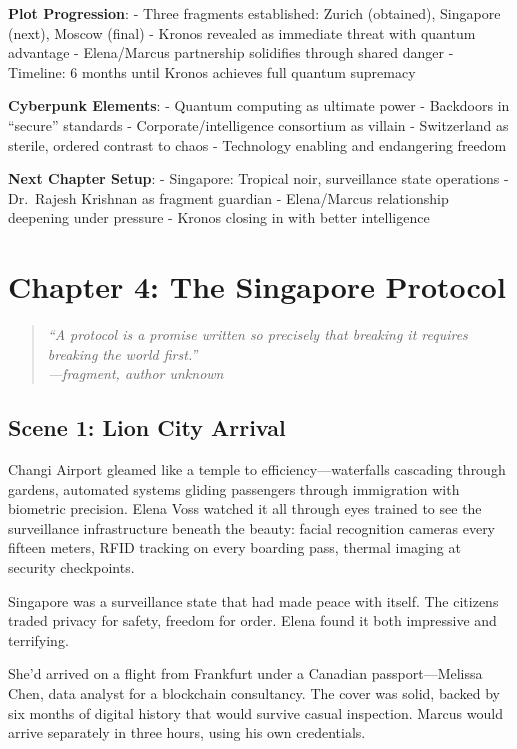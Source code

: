\documentclass[12pt,letterpaper]{book}
\begin{document}
\textbf{Plot Progression}: - Three fragments established: Zurich (obtained), Singapore (next), Moscow (final) - Kronos revealed as immediate threat with quantum advantage - Elena/Marcus partnership solidifies through shared danger - Timeline: 6 months until Kronos achieves full quantum supremacy

\textbf{Cyberpunk Elements}: - Quantum computing as ultimate power - Backdoors in ``secure'' standards - Corporate/intelligence consortium as villain - Switzerland as sterile, ordered contrast to chaos - Technology enabling and endangering freedom

\textbf{Next Chapter Setup}: - Singapore: Tropical noir, surveillance state operations - Dr.~Rajesh Krishnan as fragment guardian - Elena/Marcus relationship deepening under pressure - Kronos closing in with better intelligence


\hypertarget{chapter-4-the-singapore-protocol}{%
\section{Chapter 4: The Singapore Protocol}\label{chapter-4-the-singapore-protocol}}

\begin{quote}
\itshape ``A protocol is a promise written so precisely that breaking it requires
breaking the world first.''\\
\normalfont\hfill---fragment, author unknown
\end{quote}

\hypertarget{scene-1-lion-city-arrival}{%
\subsection{Scene 1: Lion City Arrival}\label{scene-1-lion-city-arrival}}

Changi Airport gleamed like a temple to efficiency---waterfalls cascading through gardens, automated systems gliding passengers through immigration with biometric precision. Elena Voss watched it all through eyes trained to see the surveillance infrastructure beneath the beauty: facial recognition cameras every fifteen meters, RFID tracking on every boarding pass, thermal imaging at security checkpoints.

Singapore was a surveillance state that had made peace with itself. The citizens traded privacy for safety, freedom for order. Elena found it both impressive and terrifying.

She'd arrived on a flight from Frankfurt under a Canadian passport---Melissa Chen, data analyst for a blockchain consultancy. The cover was solid, backed by six months of digital history that would survive casual inspection. Marcus would arrive separately in three hours, using his own credentials.
\end{document}
